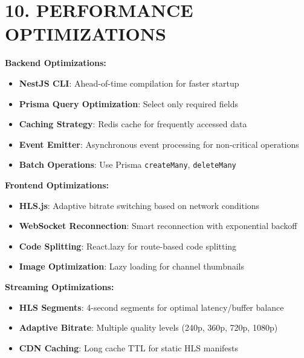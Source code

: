 \documentclass[10pt]{article}
\begin{document}
\section*{\color{primary} 10. PERFORMANCE OPTIMIZATIONS}

\noindent
\begin{tcolorbox}[
  colback=white,
  colframe=success,
  arc=3pt,
  boxrule=1pt,
  before skip=8pt,
  after skip=8pt
]

\textbf{Backend Optimizations:}
\begin{itemize}
\item \textbf{NestJS CLI}: Ahead-of-time compilation for faster startup
\item \textbf{Prisma Query Optimization}: Select only required fields
\item \textbf{Caching Strategy}: Redis cache for frequently accessed data
\item \textbf{Event Emitter}: Asynchronous event processing for non-critical operations
\item \textbf{Batch Operations}: Use Prisma \texttt{createMany}, \texttt{deleteMany}
\end{itemize}

\textbf{Frontend Optimizations:}
\begin{itemize}
\item \textbf{HLS.js}: Adaptive bitrate switching based on network conditions
\item \textbf{WebSocket Reconnection}: Smart reconnection with exponential backoff
\item \textbf{Code Splitting}: React.lazy for route-based code splitting
\item \textbf{Image Optimization}: Lazy loading for channel thumbnails
\end{itemize}

\textbf{Streaming Optimizations:}
\begin{itemize}
\item \textbf{HLS Segments}: 4-second segments for optimal latency/buffer balance
\item \textbf{Adaptive Bitrate}: Multiple quality levels (240p, 360p, 720p, 1080p)
\item \textbf{CDN Caching}: Long cache TTL for static HLS manifests
\end{itemize}

\end{tcolorbox}
\end{document}
